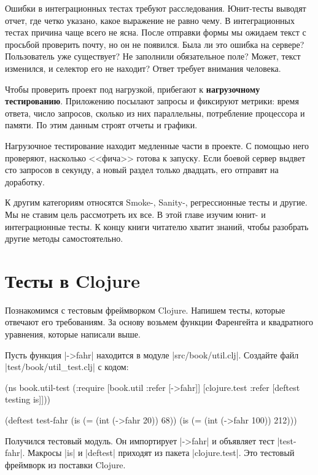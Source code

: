 Ошибки в интеграционных тестах требуют расследования. Юнит-тесты выводят отчет,
где четко указано, какое выражение не равно чему. В интеграционных тестах
причина чаще всего не ясна. После отправки формы мы ожидаем текст с просьбой
проверить почту, но он не появился. Была ли это ошибка на сервере? Пользователь
уже существует? Не заполнили обязательное поле? Может, текст изменился, и
селектор его не находит? Ответ требует внимания человека.

Чтобы проверить проект под нагрузкой, прибегают к \textbf{нагрузочному тестированию}.
Приложению посылают запросы и фиксируют метрики: время ответа,
число запросов, сколько из них параллельны, потребление процессора и
памяти. По этим данным строят отчеты и графики.

Нагрузочное тестирование находит медленные части в проекте. С помощью него
проверяют, насколько <<фича>> готова к запуску. Если боевой сервер
выдвет сто запросов в секунду, а новый раздел только двадцать, его
отправят на доработку.

К другим категориям относятся Smoke-, Sanity-, регрессионные тесты и другие. Мы
не ставим цель рассмотреть их все. В этой главе изучим юнит- и интеграционные
тесты. К концу книги читателю хватит знаний, чтобы разобрать другие методы
самостоятельно.

\section{Тесты в Clojure}

Познакомимся с тестовым фреймворком Clojure. Напишем тесты, которые отвечают его
требованиям. За основу возьмем функции Фаренгейта и квадратного уравнения,
которые написали выше.

Пусть функция \spverb|->fahr| находится в модуле \spverb|src/book/util.clj|.
Создайте файл \spverb|test/book/util_test.clj| с кодом:

\begin{english}
  \begin{clojure}
(ns book.util-test
  (:require [book.util :refer [->fahr]]
            [clojure.test :refer [deftest testing is]]))

(deftest test-fahr
  (is (= (int (->fahr 20)) 68))
  (is (= (int (->fahr 100)) 212)))
  \end{clojure}
\end{english}

Получился тестовый модуль. Он импортирует \spverb|->fahr| и объявляет тест
\spverb|test-fahr|. Макросы \spverb|is| и \spverb|deftest| приходят из пакета
\spverb|clojure.test|. Это тестовый фреймворк из поставки Clojure.

